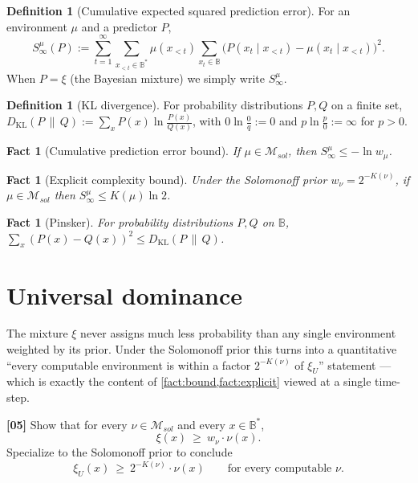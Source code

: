 \documentclass[fontsize=11pt, parskip=half]{scrartcl}
\newtheorem{fact}[theorem]{Fact}
\theoremstyle{definition}
\newtheorem{definition}[theorem]{Definition}
\newcommand{\Msol}{\mathcal{M}_{sol}}
\begin{document}
\begin{definition}[Cumulative expected squared prediction error]\label{def:S_infty}
For an environment $\mu$ and a predictor $P$,
\[
S^{\mu}_{\infty}(P) := \sum_{t=1}^{\infty}
  \sum_{x_{<t} \in \mathbb{B}^*} \mu(x_{<t})
  \sum_{x_t \in \mathbb{B}}
  \big( P(x_t \mid x_{<t}) - \mu(x_t \mid x_{<t}) \big)^2.
\]
When $P = \xi$ (the Bayesian mixture) we simply write $S^{\mu}_{\infty}$.
\end{definition}

\begin{definition}[KL divergence]\label{def:kl}
For probability distributions $P, Q$ on a finite set,
$D_{\text{KL}}(P \,\|\, Q) := \sum_x P(x) \ln \tfrac{P(x)}{Q(x)}$, with
$0 \ln \tfrac{0}{q} := 0$ and $p \ln \tfrac{p}{0} := \infty$ for $p > 0$.
\end{definition}

\begin{fact}[Cumulative prediction error bound]\label{fact:bound}
If $\mu \in \Msol$, then $S^{\mu}_{\infty} \leq -\ln w_\mu$.
\end{fact}

\begin{fact}[Explicit complexity bound]\label{fact:explicit}
Under the Solomonoff prior $w_\nu = 2^{-K(\nu)}$, if $\mu \in \Msol$ then
$S^{\mu}_{\infty} \leq K(\mu) \ln 2$.
\end{fact}

\begin{fact}[Pinsker]\label{fact:pinsker}
For probability distributions $P, Q$ on $\mathbb{B}$,
$\sum_{x} (P(x) - Q(x))^2 \leq D_{\text{KL}}(P \,\|\, Q)$.
\end{fact}

\section{Universal dominance}\label{prob:dominance}

The mixture $\xi$ never assigns much less probability than any single environment
weighted by its prior. Under the Solomonoff prior this turns into a quantitative
``every computable environment is within a factor $2^{-K(\nu)}$ of $\xi_U$''
statement --- which is exactly the content of \cref{fact:bound,fact:explicit}
viewed at a single time-step.

\bigskip

\noindent
\textbf{[05]} Show that for every $\nu \in \Msol$ and every $x \in \mathbb{B}^*$,
\[
  \xi(x) ~\geq~ w_\nu \cdot \nu(x).
\]
Specialize to the Solomonoff prior to conclude
\[
  \xi_U(x) ~\geq~ 2^{-K(\nu)} \cdot \nu(x) \qquad \text{for every computable }\nu.
\]
\end{document}
